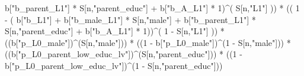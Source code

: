 \documentclass[
]{book}
\newenvironment{Shaded}{\begin{snugshade}}{\end{snugshade}}
\newcommand{\DecValTok}[1]{\textcolor[rgb]{0.00,0.00,0.81}{#1}}
\newcommand{\NormalTok}[1]{#1}
\newcommand{\SpecialCharTok}[1]{\textcolor[rgb]{0.00,0.00,0.00}{#1}}
\newcommand{\StringTok}[1]{\textcolor[rgb]{0.31,0.60,0.02}{#1}}
\begin{document}
\begin{Shaded}
\begin{Highlighting}[]
\NormalTok{           b[}\StringTok{"b\_parent\_L1"}\NormalTok{] }\SpecialCharTok{*}\NormalTok{ S[n,}\StringTok{"parent\_educ"}\NormalTok{] }\SpecialCharTok{+}
\NormalTok{           b[}\StringTok{"b\_A\_L1"}\NormalTok{] }\SpecialCharTok{*} \DecValTok{1}\NormalTok{)}\SpecialCharTok{\^{}}\NormalTok{( S[n,}\StringTok{"L1"}\NormalTok{] )) }\SpecialCharTok{*}
\NormalTok{      (( }\DecValTok{1} \SpecialCharTok{{-}}\NormalTok{ ( b[}\StringTok{"b\_L1"}\NormalTok{] }\SpecialCharTok{+}
\NormalTok{                 b[}\StringTok{"b\_male\_L1"}\NormalTok{] }\SpecialCharTok{*}\NormalTok{ S[n,}\StringTok{"male"}\NormalTok{] }\SpecialCharTok{+}  
\NormalTok{                 b[}\StringTok{"b\_parent\_L1"}\NormalTok{] }\SpecialCharTok{*}\NormalTok{ S[n,}\StringTok{"parent\_educ"}\NormalTok{] }\SpecialCharTok{+}
\NormalTok{                 b[}\StringTok{"b\_A\_L1"}\NormalTok{] }\SpecialCharTok{*} \DecValTok{1}\NormalTok{))}\SpecialCharTok{\^{}}\NormalTok{( }\DecValTok{1} \SpecialCharTok{{-}}\NormalTok{ S[n,}\StringTok{"L1"}\NormalTok{] )) }\SpecialCharTok{*}
\NormalTok{      ((b[}\StringTok{"p\_L0\_male"}\NormalTok{])}\SpecialCharTok{\^{}}\NormalTok{(S[n,}\StringTok{"male"}\NormalTok{])) }\SpecialCharTok{*} 
\NormalTok{      ((}\DecValTok{1} \SpecialCharTok{{-}}\NormalTok{ b[}\StringTok{"p\_L0\_male"}\NormalTok{])}\SpecialCharTok{\^{}}\NormalTok{(}\DecValTok{1} \SpecialCharTok{{-}}\NormalTok{ S[n,}\StringTok{"male"}\NormalTok{])) }\SpecialCharTok{*} 
\NormalTok{      ((b[}\StringTok{"p\_L0\_parent\_low\_educ\_lv"}\NormalTok{])}\SpecialCharTok{\^{}}\NormalTok{(S[n,}\StringTok{"parent\_educ"}\NormalTok{])) }\SpecialCharTok{*}
\NormalTok{      ((}\DecValTok{1} \SpecialCharTok{{-}}\NormalTok{ b[}\StringTok{"p\_L0\_parent\_low\_educ\_lv"}\NormalTok{])}\SpecialCharTok{\^{}}\NormalTok{(}\DecValTok{1} \SpecialCharTok{{-}}\NormalTok{ S[n,}\StringTok{"parent\_educ"}\NormalTok{])) }
    

\end{Highlighting}
\end{Shaded}
\end{document}
